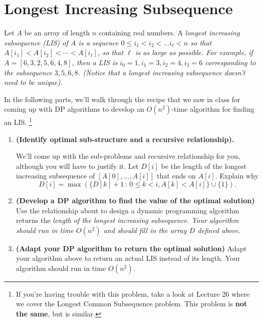\documentclass [12pt]{article}
\begin{document}
\section{Longest Increasing Subsequence }

Let $A$ be an array of length $n$ containing real numbers. A \em longest increasing subsequence \em (LIS) of $A$ is a sequence $0 \leq i_1 < i_2 < \ldots i_\ell < n$ so that $A[i_1] < A[i_2] < \cdots < A[i_\ell ]$, so that $\ell $ is as large as possible. For example, if $A = [6,3,2,5,6,4,8]$, then a LIS is $i_0 = 1, i_1 = 3, i_2 = 4, i_3 = 6$ corresponding to the subsequence $3,5,6,8$. (Notice that a longest increasing subsequence doesn't need to be unique). 

In the following parts, we'll walk through the recipe that we saw in class for coming up with DP algorithms to develop an $O(n^2)$-time algorithm for finding an LIS. \footnote{If you're having trouble with this problem, take a look at Lecture 26 where we cover the Longest Common Subsequence problem. This problem is \textbf{not the same}, but is similar.}

\begin{enumerate} 
  \item {} \textbf{(Identify optimal sub-structure and a recursive relationship).} 
  
  We'll come up with the sub-problems and recursive relationship for you, although you will have to justify it. Let $D[i]$ be the length of the longest increasing subsequence of $[A[0], \ldots , A[i]]$ that ends on $A[i]$. Explain why 
  $$
    D[i] = \max \left (\{ D[k] + 1\,:\, 0 \leq k < i, A[k] < A[i] \} \cup \{1\} \right ). 
  $$ 

  \item {} \textbf{(Develop a DP algorithm to find the value of the optimal solution)} Use the relationship about to design a dynamic programming algorithm returns the \em length \em of the longest increasing subsequence. Your algorithm should run in time $O(n^2)$ and should fill in the array $D$ defined above. 
  

  \item {} \textbf{(Adapt your DP algorithm to return the optimal solution)} Adapt your algorithm above to return an actual LIS instead of its length. Your algorithm should run in time $O(n^2)$. 


\end{enumerate} 
\end{document}
